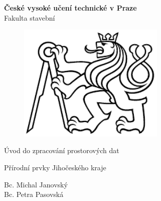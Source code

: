 \documentclass[a4paper, 12pt]{article}
\begin{document}
\begin{titlepage}
\begin{center}
\noindent
\Large \textbf{České vysoké učení technické v Praze }\\ Fakulta stavební
\vspace{5cm}

\huge

\begin{figure}[h!]
	\centering
	\includegraphics[width=7cm]{logo.png}
\end{figure}

\vspace{0.5cm}

Úvod do zpracování prostorových dat \\

\vspace{3cm}

\Huge  
Přírodní prvky Jihočeského kraje\\

\vspace{2cm}

\Large
Bc. Michal Janovský \\
Bc. Petra Pasovská \\

\end{center}

\end{titlepage}




\pagestyle{plain}     %
\setcounter{page}{1}  %

\tableofcontents
\newpage
\end{document}
